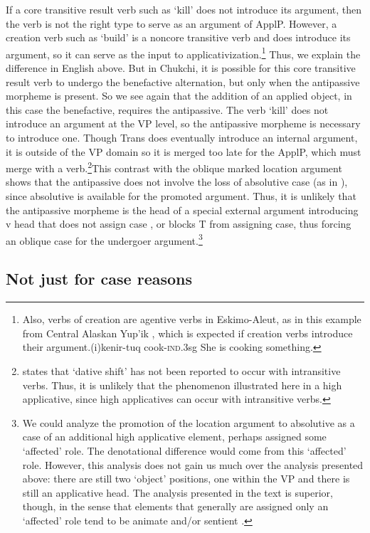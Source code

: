 \documentclass[output=paper,modfonts,nonflat,newtxmath]{langsci/langscibook}
\begin{document}
If a core transitive result verb such as ‘kill’ does not introduce its argument, then the verb is not the right type to serve as an argument of ApplP. However, a creation verb such as ‘build’ is a noncore transitive verb and does introduce its argument, so it can serve as the input to applicativization.\footnote{Also, verbs of creation are agentive verbs in Eskimo-Aleut, as in this example from Central Alaskan Yup’ik \citep{Miyaoka2012}, which is expected if creation verbs introduce their argument.(i)kenir-tuq      cook-\textrm{\textsc{ind}}.3\textrm{sg} She is cooking something.}  Thus, we explain the difference in English above. But in Chukchi, it is possible for this core transitive result verb to undergo the benefactive alternation, but only when the antipassive morpheme is present. So we see again that the addition of an applied object, in this case the benefactive, requires the antipassive. The verb ‘kill’ does not introduce an argument at the VP level, so the antipassive morpheme is necessary to introduce one. Though Trans does eventually introduce an internal argument, it is outside of the VP domain so it is merged too late for the ApplP, which must merge with a verb.\footnote{\citet{Spencer1995} states that ‘dative shift’ has not been reported to occur with intransitive verbs. Thus, it is unlikely that the phenomenon illustrated here in a high applicative, since high applicatives can occur with intransitive verbs.}This contrast with the oblique marked location argument shows that the antipassive does not involve the loss of absolutive case (as in \citealt{Baker1988}), since absolutive is available for the promoted argument. Thus, it is unlikely that the antipassive morpheme is the head of a special external argument introducing v head that does not assign case \citep{Levins2015}, or blocks T from assigning case, thus forcing an oblique case for the undergoer argument.\footnote{We could analyze the promotion of the location argument to absolutive as a case of an additional high applicative element, perhaps assigned some ‘affected’ role. The denotational difference would come from this ‘affected’ role. However, this analysis does not gain us much over the analysis presented above: there are still two ‘object’ positions, one within the VP and there is still an applicative head. The analysis presented in the text is superior, though, in the sense that elements that generally are assigned only an ‘affected’ role tend to be animate and/or sentient \citep{BosseEtAl2012}.} 

\subsection{Not just for case reasons} %
\end{document}
